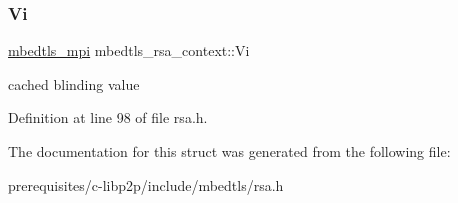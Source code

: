 \subsubsection{\texorpdfstring{Vi}{Vi}}
{\footnotesize\ttfamily \mbox{\hyperlink{structmbedtls__mpi}{mbedtls\+\_\+mpi}} mbedtls\+\_\+rsa\+\_\+context\+::\+Vi}

cached blinding value 

Definition at line 98 of file rsa.\+h.



The documentation for this struct was generated from the following file\+:\begin{DoxyCompactItemize}
\item 
prerequisites/c-\/libp2p/include/mbedtls/rsa.\+h\end{DoxyCompactItemize}
